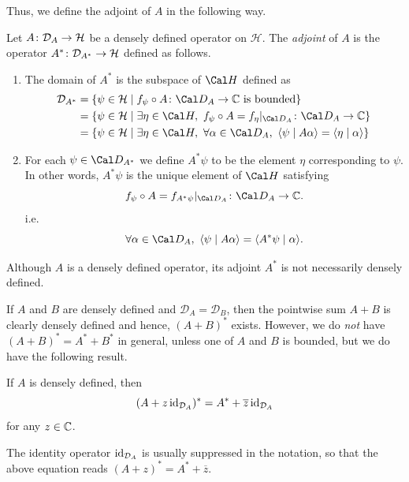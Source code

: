 Thus, we define the adjoint of \(A\) in the following way.
\begin{definition}
  Let $A\colon \mathcal{D}_A\to \mathcal{H}$ be a densely defined
  operator on $\mathcal{H}$. The \emph{adjoint} of $A$
  is the operator $A^*\colon\mathcal{D}_{A^*}\to\mathcal{H}$ defined as follows.
  \begin{enumerate}[label=(\roman*)]
    \item
      The domain of \(A^*\) is the subspace of \(\Cal H\) defined as
      \begin{align}
        \mathcal{D}_{A^*}
        &=
        \{
          \psi\in\mathcal{H}
          \mid
          f_\psi\circ A\colon\Cal D_A\to\C \text{ is bounded}
        \} \\
        &=
        \{
          \psi\in\mathcal{H}
          \mid
          \exists\eta\in\Cal H, \
          f_\psi\circ A=f_\eta|_{\Cal D_A}\colon\Cal D_A\to\C
        \} \\
        &=
        \{
          \psi\in\mathcal{H}
          \mid
          \exists\eta\in\Cal H, \
          \forall\alpha\in\Cal D_A, \
          \langle \psi\mid A\alpha \rangle = \langle \eta\mid\alpha\rangle
        \}
      \end{align}
    \item
      For each \(\psi\in\Cal D_{A^*}\) we define $A^*\psi$ to be the
      element \(\eta\) corresponding to \(\psi\).
      In other words, \(A^*\psi\) is
      the unique element of \(\Cal H\) satisfying
      \begin{equation}
        f_\psi\circ A = f_{A^*\psi}|_{\Cal D_A} \colon\Cal D_A\to\C.
      \end{equation}
      i.e.
      \begin{equation}
        \forall\alpha\in\Cal D_A, \
        \langle \psi\mid A\alpha\rangle
        =
        \langle A^*\psi\mid \alpha\rangle.
      \end{equation}
  \end{enumerate}
\end{definition}

\begin{remark}
  Although \(A\) is a densely defined operator,
  its adjoint \(A^*\) is not necessarily densely defined.
\end{remark}

If $A$ and $B$ are densely defined and $\mathcal{D}_A=\mathcal{D}_B$,
then the pointwise sum $A+B$ is clearly densely defined and hence,
$(A+B)^*$ exists. However, we do \emph{not} have $(A+B)^*=A^*+B^*$ in
general, unless one of $A$ and $B$ is bounded, but we do have the
following result.
\begin{proposition}
If $A$ is densely defined, then 
\begin{equation*}
(A+z\operatorname{id}_{\mathcal{D}_A})^*=A^*+\overline{z}\operatorname{id}_{\mathcal{D}_A}
\end{equation*}
for any $z\in\mathbb{C}$.
\end{proposition}
The identity operator $\operatorname{id}_{\mathcal{D}_A}$ is usually suppressed in the notation, so that the above equation reads $(A+z)^*=A^*+\overline{z}$.


